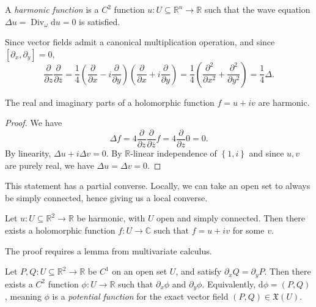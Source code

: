 
\begin{definition}\label{1.1.15}
	A \emph{harmonic function} is a $C^2$ function $u : U\subseteq \mathbb{R} ^n\to \mathbb{R} $ such that the wave equation $\Delta u=\operatorname{Div} _\omega \mathrm{d} u=0$ is satisfied.
\end{definition}

\begin{remark}\label{1.1.16}
	Since vector fields admit a canonical multiplication operation, and since $[\partial _x,\partial _y]=0$,
	\[
		\frac{\partial }{\partial z} \frac{\partial }{\partial \overline{z} } =\frac{1}{4} \left( \frac{\partial }{\partial x} -i \frac{\partial }{\partial y}  \right) \left( \frac{\partial }{\partial x} +i \frac{\partial }{\partial y}  \right) =\frac{1}{4} \left(\frac{\partial ^2}{\partial x^2} +\frac{\partial ^2}{\partial y^2} \right)=\frac{1}{4} \Delta 
	.\]
\end{remark}

\begin{proposition}\label{1.1.17}
	The real and imaginary parts of a holomorphic function $f=u+iv$ are harmonic.
\end{proposition}
\begin{proof}
	We have
	\[
		\Delta f=4 \frac{\partial }{\partial z} \frac{\partial }{\partial \overline{z} } f=4 \frac{\partial }{\partial z} 0=0
	.\]
	By linearity, $\Delta u+i\Delta v=0$. By $\mathbb{R} $-linear independence of $\left\{ 1,i \right\} $ and since $u,v$ are purely real, we have $\Delta u=\Delta v=0$.
\end{proof}

This statement has a partial converse. Locally, we can take an open set to always be simply connected, hence giving us a local converse.

\begin{proposition}\label{1.1.18}
	Let $u : U\subseteq \mathbb{R} ^2 \to \mathbb{R} $ be harmonic, with $U$ open and simply connected. Then there exists a holomorphic function $f : U \to \mathbb{C} $ such that $f=u+iv$ for some $v$.
\end{proposition}

The proof requires a lemma from multivariate calculus.

\begin{proposition}\label{1.1.19}
	Let $P,Q : U\subseteq \mathbb{R} ^2 \to \mathbb{R} $ be $C^1$ on an open set $U$, and satisfy $\partial _xQ=\partial _yP$. Then there exists a $C^2$ function $\phi  : U \to \mathbb{R} $ such that $\partial _x\phi $ and $\partial _y\phi $. Equivalently, $\mathrm{d} \phi =(P,Q)$, meaning $\phi $ is a \emph{potential function} for the exact vector field $(P,Q)\in \mathfrak{X} (U)$. 
\end{proposition}

